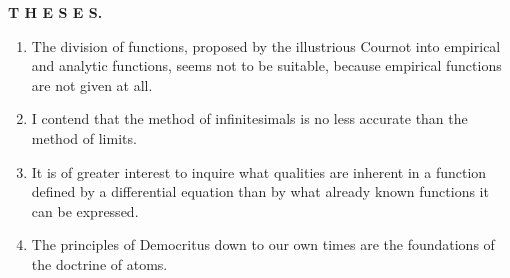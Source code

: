 \begingroup\small
\begin{center}
{\large\bfseries T H E S E S. \textbullet}
\end{center}

\begin{enumerate}
\renewcommand{\labelenumi}{\Roman{enumi}.}
\item The division of functions, proposed by the illustrious Cournot into empirical and analytic functions, seems not to be suitable, because empirical functions are not given at all.
\item I contend that the method of infinitesimals is no less accurate than the method of limits.
\item It is of greater interest to inquire what qualities are inherent in a function defined by a differential equation than by what already known functions it can be expressed.
\item The principles of Democritus down to our own times are the foundations of the doctrine of atoms.
\end{enumerate}

\GordanOrnament
\endgroup
